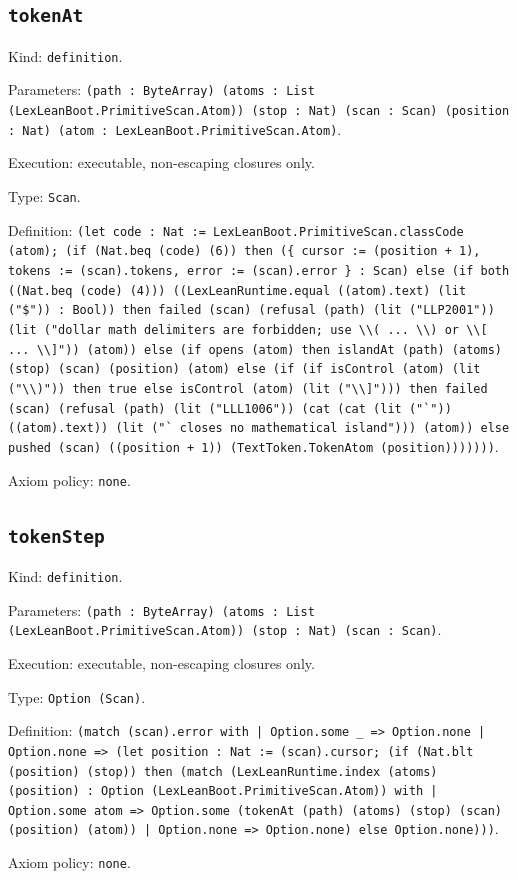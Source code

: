 \documentclass[11pt]{article}
\begin{document}
\subsection*{\texttt{tokenAt}}
\noindent Kind: \texttt{definition}.\par
\noindent Parameters: \texttt{(path : ByteArray) (atoms : List (LexLeanBoot.PrimitiveScan.Atom)) (stop : Nat) (scan : Scan) (position : Nat) (atom : LexLeanBoot.PrimitiveScan.Atom)}.\par
\noindent Execution: executable, non-escaping closures only.\par
\noindent Type: \texttt{Scan}.\par
\noindent Definition: \texttt{(let code : Nat := LexLeanBoot.PrimitiveScan.classCode (atom); (if (Nat.beq (code) (6)) then (\{ cursor := (position + 1), tokens := (scan).tokens, error := (scan).error \} : Scan) else (if both ((Nat.beq (code) (4))) ((LexLeanRuntime.equal ((atom).text) (lit ("\$")) : Bool)) then failed (scan) (refusal (path) (lit ("LLP2001")) (lit ("dollar math delimiters are forbidden; use \textbackslash{}\textbackslash{}( ... \textbackslash{}\textbackslash{}) or \textbackslash{}\textbackslash{}[ ... \textbackslash{}\textbackslash{}]")) (atom)) else (if opens (atom) then islandAt (path) (atoms) (stop) (scan) (position) (atom) else (if (if isControl (atom) (lit ("\textbackslash{}\textbackslash{})")) then true else isControl (atom) (lit ("\textbackslash{}\textbackslash{}]"))) then failed (scan) (refusal (path) (lit ("LLL1006")) (cat (cat (lit ("`")) ((atom).text)) (lit ("` closes no mathematical island"))) (atom)) else pushed (scan) ((position + 1)) (TextToken.TokenAtom (position)))))))}.\par
\noindent Axiom policy: \texttt{none}.\par
\subsection*{\texttt{tokenStep}}
\noindent Kind: \texttt{definition}.\par
\noindent Parameters: \texttt{(path : ByteArray) (atoms : List (LexLeanBoot.PrimitiveScan.Atom)) (stop : Nat) (scan : Scan)}.\par
\noindent Execution: executable, non-escaping closures only.\par
\noindent Type: \texttt{Option (Scan)}.\par
\noindent Definition: \texttt{(match (scan).error with | Option.some \_ => Option.none | Option.none => (let position : Nat := (scan).cursor; (if (Nat.blt (position) (stop)) then (match (LexLeanRuntime.index (atoms) (position) : Option (LexLeanBoot.PrimitiveScan.Atom)) with | Option.some atom => Option.some (tokenAt (path) (atoms) (stop) (scan) (position) (atom)) | Option.none => Option.none) else Option.none)))}.\par
\noindent Axiom policy: \texttt{none}.\par
\end{document}
